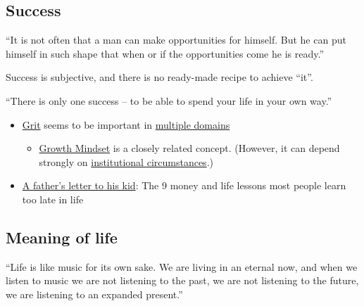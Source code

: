 \documentclass{article}
\begin{document}
\subsection{Success}

\vspace{1cm}
{``It is not often that a man can make opportunities for himself. But he can put himself in such shape that when or if the opportunities come he is ready.''
\\[5pt]
}

Success is subjective, and there is no ready-made recipe to achieve ``it''.

\vspace{1cm}
{``There is only one success -- to be able to spend your life in your own way.''
\\[5pt]
}


\begin{itemize}
    \item \href{https://www.youtube.com/watch?v=H14bBuluwB8}{Grit} seems to be important in \href{https://psycnet.apa.org/doiLanding?doi=10.1037%2F0022-3514.92.6.1087}{multiple domains}
    \begin{itemize}
        \item \href{https://www.themarginalian.org/2014/01/29/carol-dweck-mindset/}{Growth Mindset} is a closely related concept. (However, it can depend strongly on \href{https://hbr.org/2016/01/what-having-a-growth-mindset-actually-means}{institutional circumstances}.)
    \end{itemize}
    \item \href{https://www.cnbc.com/2020/06/19/fathers-day-letter-to-kid-money-life-lessons-people-learn-too-late-in-life.html}{A father’s letter to his kid}: The 9 money and life lessons most people learn too late in life 
\end{itemize}

\subsection{Meaning of life}

\vspace{1cm}
{``Life is like music for its own sake. We are living in an eternal now, and when we listen to music we are not listening to the past, we are not listening to the future, we are listening to an expanded present.''
\\[5pt]
}
\end{document}
